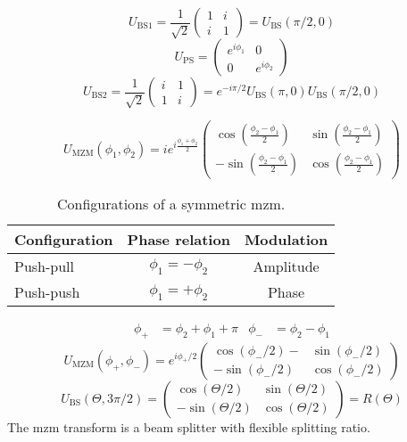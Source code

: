 \begin{equation}
	U_\text{BS1}
	=
	\frac{1}{\sqrt{2}}
	\begin{pmatrix}
		1 & i \\
		i & 1
	\end{pmatrix}
	=
	U_\text{BS}(\pi/2,0)	
\end{equation}
\begin{equation}
	U_\text{PS}
	=
	\begin{pmatrix}
		e^{i\phi_1} & 0 \\
		0 & e^{i\phi_2}
	\end{pmatrix}	
\end{equation}
\begin{equation}
	U_\text{BS2}
	=
	\frac{1}{\sqrt{2}}
	\begin{pmatrix}
		i & 1 \\
		1 & i
	\end{pmatrix}
	=
	e^{-i\pi/2}
	U_\text{BS}(\pi,0)
	U_\text{BS}(\pi/2,0)
\end{equation}

\begin{equation}
	U_\text{MZM}(\phi_1,\phi_2)
	=
	ie^{i\frac{\phi_1+\phi_2}{2}}
	\begin{pmatrix}
		\cos(\frac{\phi_2-\phi_1}{2}) & \sin(\frac{\phi_2-\phi_1}{2}) \\
		-\sin(\frac{\phi_2-\phi_1}{2}) & \cos(\frac{\phi_2-\phi_1}{2})
	\end{pmatrix}
\end{equation}
\begin{table}[htb]
	\centering
	\begin{tabular}{lcc}
		\toprule
		Configuration & Phase relation & Modulation \\
		\midrule
		Push-pull & $\phi_1=-\phi_2$ & Amplitude \\
		Push-push & $\phi_1=+\phi_2$ & Phase \\
		\bottomrule
	\end{tabular}
	\caption{Configurations of a symmetric \gls{mzm}.}
\end{table}
\begin{align}
	\phi_+
	&=
	\phi_2
	+
	\phi_1
	+
	\pi
	&
	\phi_-
	&=
	\phi_2-\phi_1
\end{align}
\begin{equation}
	U_\text{MZM}(\phi_+,\phi_-)
	=
	e^{i\phi_+/2}
	\begin{pmatrix}
		\cos(\phi_-/2)- & \sin(\phi_-/2) \\
		-\sin(\phi_-/2) & \cos(\phi_-/2)
	\end{pmatrix}
\end{equation}
\begin{equation}
	U_\text{BS}(\Theta,3\pi/2)
	=
	\begin{pmatrix}
		\cos(\Theta/2) & \sin(\Theta/2) \\
		-\sin(\Theta/2) & \cos(\Theta/2)
	\end{pmatrix}
	=
	R(\Theta)
\end{equation}
The \gls{mzm} transform is a beam splitter with flexible splitting ratio.

